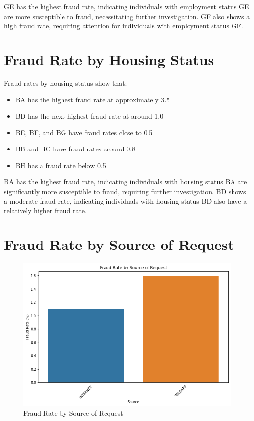 \documentclass[12pt,a4paper]{report}
\begin{document}
GE has the highest fraud rate, indicating individuals with employment status GE are more susceptible to fraud, necessitating further investigation. GF also shows a high fraud rate, requiring attention for individuals with employment status GF.

\section{Fraud Rate by Housing Status}

Fraud rates by housing status show that:

\begin{itemize}
    \item BA has the highest fraud rate at approximately 3.5%
    \item BD has the next highest fraud rate at around 1.0%
    \item BE, BF, and BG have fraud rates close to 0.5%
    \item BB and BC have fraud rates around 0.8%
    \item BH has a fraud rate below 0.5%
\end{itemize}

BA has the highest fraud rate, indicating individuals with housing status BA are significantly more susceptible to fraud, requiring further investigation. BD shows a moderate fraud rate, indicating individuals with housing status BD also have a relatively higher fraud rate.

\section{Fraud Rate by Source of Request}

\begin{figure}
    \centering
    \includegraphics[width=\textwidth]{Fraud_Rate_by_Source_of_Request.png}
    \caption{Fraud Rate by Source of Request}
    \label{fig:fraud_rate_source_of_request}
\end{figure}
\end{document}
